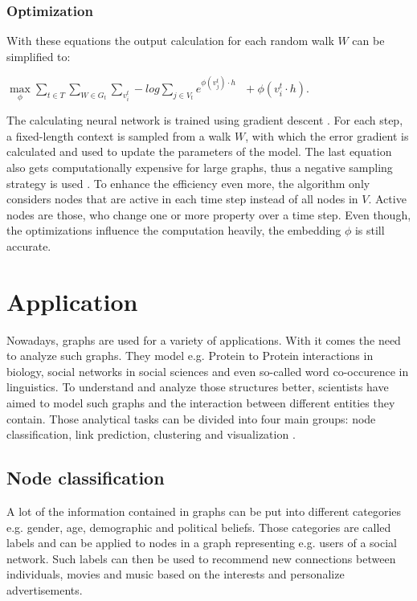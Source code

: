 \documentclass[sigconf]{acmart}
\begin{document}
\subsubsection{Optimization}
With these equations the output calculation for each random walk \(W\) can be simplified to: 
\begin{center}
  \(\max\limits_\phi \sum\limits_{t \in T}\sum\limits_{W\in G_t}\sum\limits_{v_i^t} -log\sum\limits_{j\in V_t} e^{\phi(v_j^t)\cdot h}\:\:\: +\phi(v_i^t \cdot h)\).
\end{center}
The calculating neural network is trained using gradient descent \cite{Ruder.15.09.2016}. For each step, a fixed-length context is sampled from a walk \(W\), with which the error gradient is calculated and used to update the parameters of the model.
The last equation also gets computationally expensive for large graphs, thus a negative sampling strategy is used \cite{Goldberg.15.02.2014}. To enhance the efficiency even more, 
the algorithm only considers nodes that are active in each time step instead of all nodes in \(V\). Active nodes are those, who change one or more property over a time step.
Even though, the optimizations influence the computation heavily, the embedding \(\phi\) is still accurate. \cite{Beladev.2020}


\section{Application}
Nowadays, graphs are used for a variety of applications. With it comes the need to analyze such graphs. They model e.g. Protein to Protein interactions in biology, social networks in social sciences and even  so-called word co-occurence in linguistics.
To understand and analyze those structures better, scientists have aimed to model such graphs and the interaction between different entities they contain.
Those analytical tasks can be divided into four main groups: node classification, link prediction, clustering and visualization \cite{Goyal.2018}.

\subsection{Node classification}
A lot of the information contained in graphs can be put into different categories e.g. gender, age, demographic and political beliefs. Those categories are called labels and can be applied to nodes in a graph representing e.g. users of a social network.
Such labels can then be used to recommend new connections between individuals, movies and music based on the interests and personalize advertisements.
\end{document}
